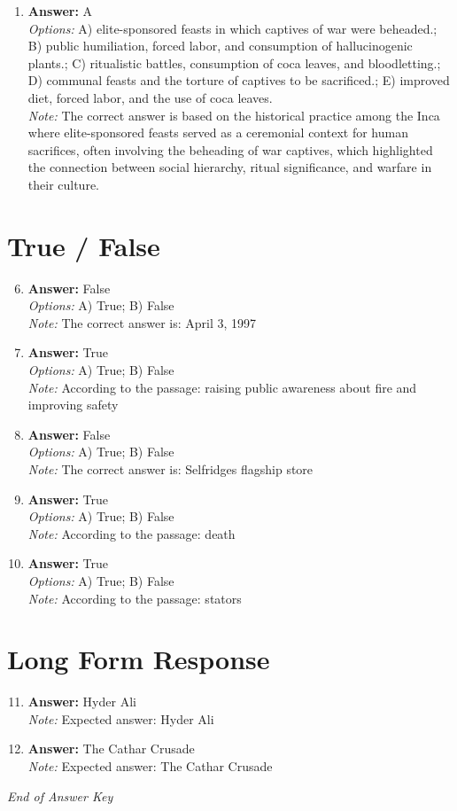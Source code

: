 \documentclass[12pt]{article}
\begin{document}
\begin{enumerate}[label=\arabic*.]
\item \textbf{Answer:} A
\\ \textit{Options:} A) elite-sponsored feasts in which captives of war were beheaded.; B) public humiliation, forced labor, and consumption of hallucinogenic plants.; C) ritualistic battles, consumption of coca leaves, and bloodletting.; D) communal feasts and the torture of captives to be sacrificed.; E) improved diet, forced labor, and the use of coca leaves.
\\ \textit{Note:} The correct answer is based on the historical practice among the Inca where elite-sponsored feasts served as a ceremonial context for human sacrifices, often involving the beheading of war captives, which highlighted the connection between social hierarchy, ritual significance, and warfare in their culture.
\end{enumerate}

\section*{True / False}
\begin{enumerate}[label=\arabic*.]
\setcounter{enumi}{5}
\item \textbf{Answer:} False
\\ \textit{Options:} A) True; B) False
\\ \textit{Note:} The correct answer is: April 3, 1997
\item \textbf{Answer:} True
\\ \textit{Options:} A) True; B) False
\\ \textit{Note:} According to the passage: raising public awareness about fire and improving safety
\item \textbf{Answer:} False
\\ \textit{Options:} A) True; B) False
\\ \textit{Note:} The correct answer is: Selfridges flagship store
\item \textbf{Answer:} True
\\ \textit{Options:} A) True; B) False
\\ \textit{Note:} According to the passage: death
\item \textbf{Answer:} True
\\ \textit{Options:} A) True; B) False
\\ \textit{Note:} According to the passage: stators
\end{enumerate}

\section*{Long Form Response}
\begin{enumerate}[label=\arabic*.]
\setcounter{enumi}{10}
\item \textbf{Answer:} Hyder Ali
\\ \textit{Note:} Expected answer: Hyder Ali
\item \textbf{Answer:} The Cathar Crusade
\\ \textit{Note:} Expected answer: The Cathar Crusade
\end{enumerate}

\vfill
\noindent\textit{End of Answer Key}
\end{document}
